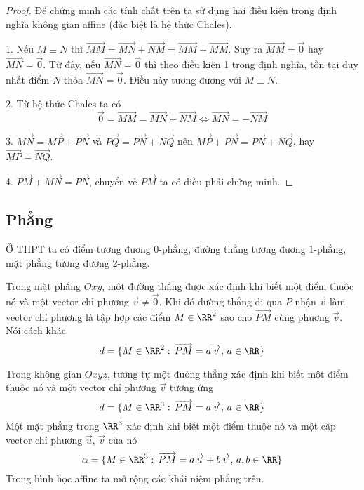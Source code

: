 \begin{proof}
	Để chứng minh các tính chất trên ta sử dụng hai điều kiện trong định nghĩa không gian affine (đặc biệt là hệ thức Chales).
	
    1. Nếu $M \equiv N$ thì $\overrightarrow{MM} = \overrightarrow{MN} + \overrightarrow{NM} = \overrightarrow{MM} + \overrightarrow{MM}$. Suy ra $\overrightarrow{MM} = \overrightarrow{0}$ hay $\overrightarrow{MN} = \overrightarrow{0}$. Từ đây, nếu $\overrightarrow{MN} = \overrightarrow{0}$ thì theo điều kiện 1 trong định nghĩa, tồn tại duy nhất điểm $N$ thỏa $\overrightarrow{MN} = \overrightarrow{0}$. Điều này tương đương với $M \equiv N$.

    2. Từ hệ thức Chales ta có 
    \begin{equation*}
        \overrightarrow{0} = \overrightarrow{MM} = \overrightarrow{MN} + \overrightarrow{NM} \Leftrightarrow \overrightarrow{MN} = -\overrightarrow{NM}
    \end{equation*}
	
    3. $\overrightarrow{MN} = \overrightarrow{MP} + \overrightarrow{PN}$ và $\overrightarrow{PQ} = \overrightarrow{PN} + \overrightarrow{NQ}$ nên $\overrightarrow{MP} + \overrightarrow{PN} = \overrightarrow{PN} + \overrightarrow{NQ}$, hay $\overrightarrow{MP} = \overrightarrow{NQ}$.
	
    4. $\overrightarrow{PM} + \overrightarrow{MN} = \overrightarrow{PN}$, chuyển vế $\overrightarrow{PM}$ ta có điều phải chứng minh.
\end{proof}

\subsection*{Phẳng}

Ở THPT ta có điểm tương đương 0-phẳng, đường thẳng tương đương 1-phẳng, mặt phẳng tương đương 2-phẳng.

Trong mặt phẳng $Oxy$, một đường thẳng được xác định khi biết một điểm thuộc nó và một vector chỉ phương $\overrightarrow{v} \neq \overrightarrow{0}$. Khi đó đường thẳng đi qua $P$ nhận $\overrightarrow{v}$ làm vector chỉ phương là tập hợp các điểm $M \in \RR^2$ sao cho $\overrightarrow{PM}$ cùng phương $\overrightarrow{v}$. Nói cách khác \[d = \{ M \in \RR^2: \, \overrightarrow{PM} = a \overrightarrow{v},\, a \in \RR \}\]

Trong không gian $Oxyz$, tương tự một đường thẳng xác định khi biết một điểm thuộc nó và một vector chỉ phương $\overrightarrow{v}$ tương ứng \[d = \{ M \in \RR^3:\, \overrightarrow{PM} = a \overrightarrow{v},\, a \in \RR \}\]
Một mặt phẳng trong $\RR^3$ xác định khi biết một điểm thuộc nó và một cặp vector chỉ phương $\overrightarrow{u}$, $\overrightarrow{v}$ của nó \[\alpha = \{ M \in \RR^3:\, \overrightarrow{PM} = a \overrightarrow{u} + b \overrightarrow{v}, \, a, b \in \RR \}\]
Trong hình học affine ta mở rộng các khái niệm phẳng trên.

